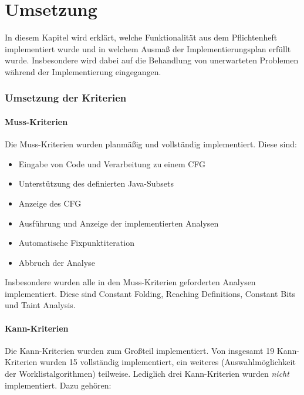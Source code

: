 
\part{Umsetzung}

In diesem Kapitel wird erklärt, welche Funktionalität aus dem Pflichtenheft implementiert wurde und in welchem Ausmaß der Implementierungsplan erfüllt wurde.
Insbesondere wird dabei auf die Behandlung von unerwarteten Problemen während der Implementierung eingegangen.

\section{Umsetzung der Kriterien}

\subsection{Muss-Kriterien}

Die Muss-Kriterien wurden planmäßig und vollständig implementiert. Diese sind:

\begin{itemize}
  \item Eingabe von Code und Verarbeitung zu einem CFG
  \item Unterstützung des definierten Java-Subsets
  \item Anzeige des CFG
  \item Ausführung und Anzeige der implementierten Analysen
  \item Automatische Fixpunktiteration
  \item Abbruch der Analyse 
\end{itemize}

Insbesondere wurden alle in den Muss-Kriterien geforderten Analysen implementiert.
Diese sind Constant Folding, Reaching Definitions, Constant Bits und Taint Analysis.

\subsection{Kann-Kriterien}

Die Kann-Kriterien wurden zum Großteil implementiert.
Von insgesamt 19 Kann-Kriterien wurden 15 vollständig implementiert, ein weiteres (Auswahlmöglichkeit der Worklistalgorithmen) teilweise.
Lediglich drei Kann-Kriterien wurden \textit{nicht} implementiert. Dazu gehören:

